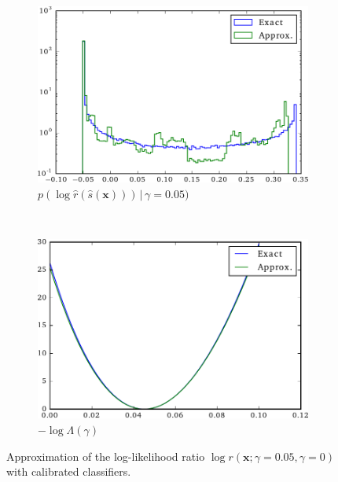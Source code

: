 \documentclass[12pt]{article}
\numberwithin{equation}{section}
\theoremstyle{plain}
\begin{document}
\begin{figure}
    ~ %
    \begin{subfigure}[b]{0.4\textwidth}
        \includegraphics[width=\textwidth]{figures/fig-ratio-dist.pdf}
        \caption{$p( \log \hat r(\hat{s}(\mathbf{x}))) \, | \,\gamma = 0.05)$ }
        \label{fig:decomposed_ratio}
    \end{subfigure}
    ~
    \begin{subfigure}[b]{0.4\textwidth}
        \includegraphics[width=\textwidth]{figures/fig-likelihood.pdf}
        \caption{$-\log \Lambda(\gamma)$ }
        \label{fig:likelihood}
    \end{subfigure}

    \caption{Approximation of the log-likelihood ratio
             $\log r(\mathbf{x};\gamma=0.05,\gamma=0)$
             with calibrated classifiers. }
\end{figure}
\end{document}
